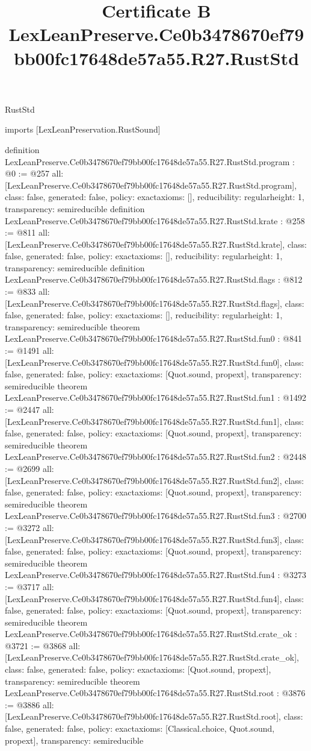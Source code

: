 \begin{lexlean}{RustStd}
\title{Certificate B LexLeanPreserve.Ce0b3478670ef79bb00fc17648de57a55.R27.RustStd}
\begin{coremodule}
imports [LexLeanPreservation.RustSound]

definition LexLeanPreserve.Ce0b3478670ef79bb00fc17648de57a55.R27.RustStd.program : @0 := @257 {
  all: [LexLeanPreserve.Ce0b3478670ef79bb00fc17648de57a55.R27.RustStd.program],
  class: false,
  generated: false,
  policy: exact{axioms: []},
  reducibility: regular{height: 1},
  transparency: semireducible
}
definition LexLeanPreserve.Ce0b3478670ef79bb00fc17648de57a55.R27.RustStd.krate : @258 := @811 {
  all: [LexLeanPreserve.Ce0b3478670ef79bb00fc17648de57a55.R27.RustStd.krate],
  class: false,
  generated: false,
  policy: exact{axioms: []},
  reducibility: regular{height: 1},
  transparency: semireducible
}
definition LexLeanPreserve.Ce0b3478670ef79bb00fc17648de57a55.R27.RustStd.flags : @812 := @833 {
  all: [LexLeanPreserve.Ce0b3478670ef79bb00fc17648de57a55.R27.RustStd.flags],
  class: false,
  generated: false,
  policy: exact{axioms: []},
  reducibility: regular{height: 1},
  transparency: semireducible
}
theorem LexLeanPreserve.Ce0b3478670ef79bb00fc17648de57a55.R27.RustStd.fun0 : @841 := @1491 {
  all: [LexLeanPreserve.Ce0b3478670ef79bb00fc17648de57a55.R27.RustStd.fun0],
  class: false,
  generated: false,
  policy: exact{axioms: [Quot.sound, propext]},
  transparency: semireducible
}
theorem LexLeanPreserve.Ce0b3478670ef79bb00fc17648de57a55.R27.RustStd.fun1 : @1492 := @2447 {
  all: [LexLeanPreserve.Ce0b3478670ef79bb00fc17648de57a55.R27.RustStd.fun1],
  class: false,
  generated: false,
  policy: exact{axioms: [Quot.sound, propext]},
  transparency: semireducible
}
theorem LexLeanPreserve.Ce0b3478670ef79bb00fc17648de57a55.R27.RustStd.fun2 : @2448 := @2699 {
  all: [LexLeanPreserve.Ce0b3478670ef79bb00fc17648de57a55.R27.RustStd.fun2],
  class: false,
  generated: false,
  policy: exact{axioms: [Quot.sound, propext]},
  transparency: semireducible
}
theorem LexLeanPreserve.Ce0b3478670ef79bb00fc17648de57a55.R27.RustStd.fun3 : @2700 := @3272 {
  all: [LexLeanPreserve.Ce0b3478670ef79bb00fc17648de57a55.R27.RustStd.fun3],
  class: false,
  generated: false,
  policy: exact{axioms: [Quot.sound, propext]},
  transparency: semireducible
}
theorem LexLeanPreserve.Ce0b3478670ef79bb00fc17648de57a55.R27.RustStd.fun4 : @3273 := @3717 {
  all: [LexLeanPreserve.Ce0b3478670ef79bb00fc17648de57a55.R27.RustStd.fun4],
  class: false,
  generated: false,
  policy: exact{axioms: [Quot.sound, propext]},
  transparency: semireducible
}
theorem LexLeanPreserve.Ce0b3478670ef79bb00fc17648de57a55.R27.RustStd.crate_ok : @3721 := @3868 {
  all: [LexLeanPreserve.Ce0b3478670ef79bb00fc17648de57a55.R27.RustStd.crate_ok],
  class: false,
  generated: false,
  policy: exact{axioms: [Quot.sound, propext]},
  transparency: semireducible
}
theorem LexLeanPreserve.Ce0b3478670ef79bb00fc17648de57a55.R27.RustStd.root : @3876 := @3886 {
  all: [LexLeanPreserve.Ce0b3478670ef79bb00fc17648de57a55.R27.RustStd.root],
  class: false,
  generated: false,
  policy: exact{axioms: [Classical.choice, Quot.sound, propext]},
  transparency: semireducible
}


\end{coremodule}
\end{lexlean}

